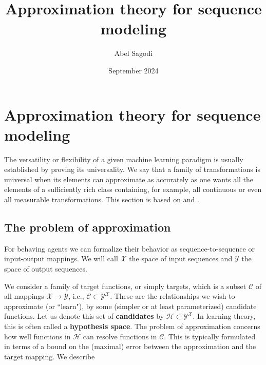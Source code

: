 \documentclass{article}
\title{Approximation theory for sequence modeling}
\author{Abel Sagodi}
\date{September 2024}
\theoremstyle{definition}
\theoremstyle{remark}
\begin{document}
\maketitle

\section{Approximation theory for sequence modeling}

The versatility or flexibility of a given machine learning paradigm is usually established by proving its universality. We say that a family of transformations is universal when its elements can approximate as accurately as one wants all the elements of a sufficiently rich class containing, for example, all continuous or even all measurable transformations.
This section is based on \citep{li2022approximation} and \citep{jiang2023brief}.






\subsection{The problem of approximation} %
For behaving agents we can formalize their behavior as sequence-to-sequence or input-output mappings.
We will call $\mathcal{X}$ the space of input sequences and $\mathcal{Y}$ the space of output sequences.

We consider a family of target functions, or simply targets, which is a subset \(\mathcal{C} \) of all mappings \( \mathcal{X} \rightarrow \mathcal{Y} \), i.e., \( \mathcal{C} \subset \mathcal{Y}^\mathcal{X} \). 
These are the relationships we wish to approximate (or ``learn"), by some (simpler or at least parameterized) candidate functions.
Let us denote this set of \textbf{candidates} by \( \mathcal{H} \subset \mathcal{Y}^\mathcal{X} \).
In learning theory, this is often called a \textbf{hypothesis space}.
The problem of approximation concerns how well functions in \( \mathcal{H} \) can resolve functions in \( \mathcal{C} \).
This is typically formulated in terms of a bound on the (maximal) error between the approximation and the target mapping.
We describe 
\end{document}

